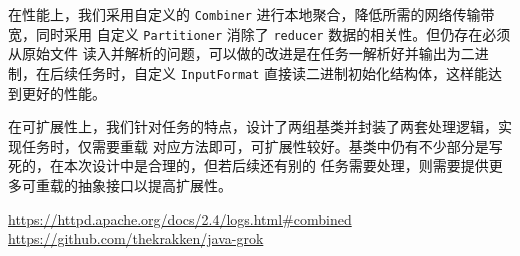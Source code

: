 \documentclass{article}
\begin{document}
  在性能上，我们采用自定义的 \verb|Combiner| 进行本地聚合，降低所需的网络传输带宽，同时采用
  自定义 \verb|Partitioner| 消除了 \verb|reducer| 数据的相关性。但仍存在必须从原始文件
  读入并解析的问题，可以做的改进是在任务一解析好并输出为二进制，在后续任务时，自定义 \verb|InputFormat| 
  直接读二进制初始化结构体，这样能达到更好的性能。

  在可扩展性上，我们针对任务的特点，设计了两组基类并封装了两套处理逻辑，实现任务时，仅需要重载
  对应方法即可，可扩展性较好。基类中仍有不少部分是写死的，在本次设计中是合理的，但若后续还有别的
  任务需要处理，则需要提供更多可重载的抽象接口以提高扩展性。

  \newpage
  \begin{thebibliography}{99}
     \href{https://httpd.apache.org/docs/2.4/logs.html#combined}{https://httpd.apache.org/docs/2.4/logs.html\#combined}
     \href{https://github.com/thekrakken/java-grok}{https://github.com/thekrakken/java-grok}
  \end{thebibliography}
\end{document}
